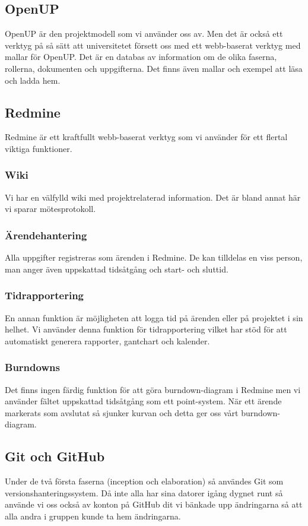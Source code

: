 \subsection{OpenUP}
OpenUP är den projektmodell som vi använder oss av. Men det är också ett verktyg på så sätt att universitetet försett oss med ett webb-baserat verktyg med mallar för OpenUP. Det är en databas av information om de olika faserna, rollerna, dokumenten och uppgifterna. Det finns även mallar och exempel att läsa och ladda hem.

\subsection{Redmine}
Redmine är ett kraftfullt webb-baserat verktyg som vi använder för ett flertal viktiga funktioner.

\subsubsection{Wiki}
Vi har en välfylld wiki med projektrelaterad information. Det är bland annat här vi sparar mötesprotokoll.

\subsubsection{Ärendehantering}
Alla uppgifter registreras som ärenden i Redmine. De kan tilldelas en viss person, man anger även uppskattad tidsåtgång och start- och sluttid.

\subsubsection{Tidrapportering}
En annan funktion är möjligheten att logga tid på ärenden eller på projektet i sin helhet. Vi använder denna funktion för tidrapportering vilket har stöd för att automatiskt generera rapporter, gantchart och kalender.

\subsubsection{Burndowns}
Det finns ingen färdig funktion för att göra burndown-diagram i Redmine men vi använder fältet uppskattad tidsåtgång som ett point-system. När ett ärende markerats som avslutat så sjunker kurvan och detta ger oss vårt burndown-diagram.

\subsection{Git och GitHub}
Under de två första faserna (inception och elaboration) så användes Git som versionshanteringssystem. Då inte alla har sina datorer igång dygnet runt så använde vi oss också av konton på GitHub dit vi bänkade upp ändringarna så att alla andra i gruppen kunde ta hem ändringarna.

